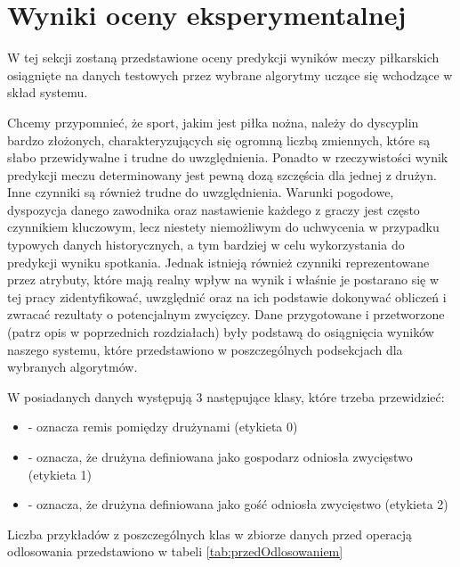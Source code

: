 \chapter{Wyniki oceny eksperymentalnej}

\noindent W tej sekcji zostaną przedstawione oceny predykcji wyników meczy piłkarskich osiągnięte na danych testowych przez wybrane algorytmy uczące się wchodzące w skład systemu. 

Chcemy przypomnieć, że sport, jakim jest piłka nożna, należy do dyscyplin bardzo złożonych, charakteryzujących się ogromną liczbą zmiennych, które są słabo przewidywalne i trudne do uwzględnienia. Ponadto w rzeczywistości wynik predykcji meczu  determinowany jest pewną dozą szczęścia dla jednej z drużyn. Inne czynniki są również trudne do uwzględnienia. Warunki pogodowe, dyspozycja danego zawodnika oraz nastawienie każdego z graczy jest często czynnikiem kluczowym, lecz niestety niemożliwym do uchwycenia w przypadku typowych danych historycznych, a tym bardziej w celu wykorzystania do predykcji wyniku spotkania. Jednak istnieją również czynniki reprezentowane przez atrybuty, które mają realny wpływ na wynik i właśnie je postarano się w tej pracy zidentyfikować, uwzględnić oraz na ich podstawie dokonywać obliczeń i zwracać rezultaty o potencjalnym zwycięzcy. Dane przygotowane i przetworzone (patrz opis w poprzednich rozdziałach) były podstawą do osiągnięcia wyników naszego systemu, które przedstawiono w poszczególnych podsekcjach dla wybranych algorytmów. 

W posiadanych danych występują 3 następujące klasy, które trzeba przewidzieć: 
\begin{itemize}
    \item {} - oznacza remis pomiędzy drużynami (etykieta 0)
    \item {} - oznacza, że drużyna definiowana jako gospodarz odniosła zwycięstwo (etykieta 1)
    \item {} - oznacza, że drużyna definiowana jako gość odniosła zwycięstwo (etykieta 2)
\end{itemize}

Liczba przykładów z poszczególnych klas w zbiorze danych przed operacją odlosowania przedstawiono w tabeli \ref{tab:przedOdlosowaniem} 


